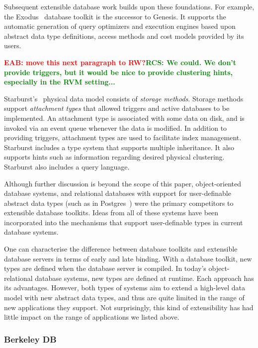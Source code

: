 \documentclass[letterpaper,twocolumn,10pt]{article}
\newcommand{\eab}[1]{\textcolor{red}{\bf EAB: #1}}
\newcommand{\rcs}[1]{\textcolor{green}{\bf RCS: #1}}
\begin{document}
Subsequent extensible database work builds upon these foundations.
For example, the Exodus~\cite{exodus} database toolkit is the successor to
Genesis. It supports the automatic generation of query optimizers and
execution engines based upon abstract data type definitions, access
methods and cost models provided by its users.

\eab{move this next paragraph to RW?}\rcs{We could.  We don't provide triggers, but it would be nice to provide clustering hints, especially in the RVM setting...}

Starburst's~\cite{starburst} physical data model consists of {\em
  storage methods}.  Storage methods support {\em attachment types}
that allowed triggers and active databases to be implemented.  An
attachment type is associated with some data on disk, and is invoked
via an event queue whenever the data is modified.  In addition to
providing triggers, attachment types are used to facilitate index management.
Starburst includes a type system that supports multiple inheritance.  
It also supports hints such as information regarding desired physical
clustering.  Starburst also includes a query language.

Although further discussion is beyond the scope of this paper,
object-oriented database systems, and relational databases with
support for user-definable abstract data types (such as in
Postgres~\cite{postgres}) were the primary competitors to extensible
database toolkits.  Ideas from all of these systems have been
incorporated into the mechanisms that support user-definable types in
current database systems.

One can characterise the difference between database toolkits and
extensible database servers in terms of early and late binding.  With
a database toolkit, new types are defined when the database server is
compiled.  In today's object-relational database systems, new types
are defined at runtime.  Each approach has its advantages.  However,
both types of systems aim to extend a high-level data model with new abstract data types, and thus are quite limited in the range of new applications they support.  Not surprisingly, this kind of extensibility has had little impact on the range of applications we listed above.

\subsubsection{Berkeley DB}

\end{document}
